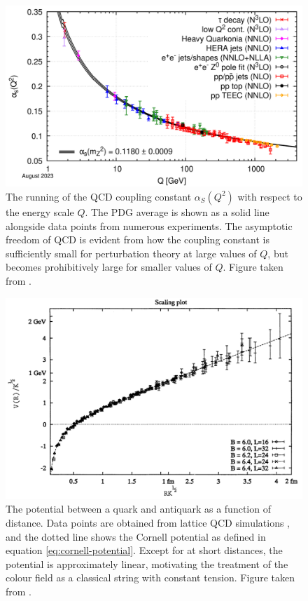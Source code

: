 \documentclass[12pt,a4paper]{report}
\begin{document}
\begin{figure}
  \centering
  \includegraphics[width=0.7\linewidth]{figures/running-coupling.png}
  \caption{The running of the QCD coupling constant $\alpha_S(Q^2)$ with respect to the energy scale $Q$. The PDG average is shown as a solid line alongside data points from numerous experiments. The asymptotic freedom of QCD is evident from how the coupling constant is sufficiently small for perturbation theory at large values of $Q$, but becomes prohibitively large for smaller values of $Q$. Figure taken from \cite{navas_review_2024}.}
  \label{fig:running-coupling}
\end{figure}

\begin{figure}
  \centering
  \includegraphics[width=0.7\linewidth]{figures/cornell-potential.png}
  \caption{The potential between a quark and antiquark as a function of distance. Data points are obtained from lattice QCD simulations \cite{Bali:1992ab}, and the dotted line shows the Cornell potential as defined in equation \eqref{eq:cornell-potential}. Except for at short distances, the potential is approximately linear, motivating the treatment of the colour field as a classical string with constant tension. Figure taken from \cite{Bali:1992ab}.}
  \label{fig:cornell-potential}
\end{figure}
\end{document}
